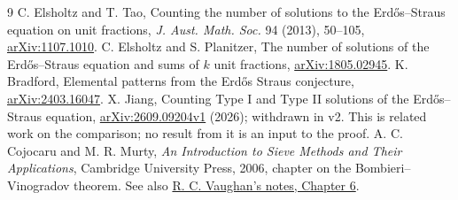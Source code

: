 \documentclass[11pt]{article}
\begin{document}
\begin{thebibliography}{9}
 C. Elsholtz and T. Tao, Counting the number of solutions to the Erd\H{o}s--Straus equation on unit fractions, \emph{J. Aust. Math. Soc.} 94 (2013), 50--105, \href{https://arxiv.org/abs/1107.1010}{arXiv:1107.1010}.
 C. Elsholtz and S. Planitzer, The number of solutions of the Erd\H{o}s--Straus equation and sums of $k$ unit fractions, \href{https://arxiv.org/abs/1805.02945}{arXiv:1805.02945}.
 K. Bradford, Elemental patterns from the Erd\H{o}s Straus conjecture, \href{https://arxiv.org/abs/2403.16047}{arXiv:2403.16047}.
 X. Jiang, Counting Type I and Type II solutions of the Erd\H{o}s--Straus equation, \href{https://arxiv.org/abs/2609.09204v1}{arXiv:2609.09204v1} (2026); withdrawn in v2. This is related work on the comparison; no result from it is an input to the proof.
 A. C. Cojocaru and M. R. Murty, \emph{An Introduction to Sieve Methods and Their Applications}, Cambridge University Press, 2006, chapter on the Bombieri--Vinogradov theorem. See also \href{https://personal.science.psu.edu/rcv4/571s25/Class571-06.pdf}{R. C. Vaughan's notes, Chapter 6}.
\end{thebibliography}
\end{document}
